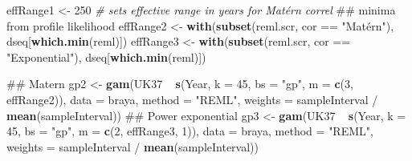 \documentclass[12pt,]{article}
\newenvironment{Shaded}{\begin{snugshade}}{\end{snugshade}}
\newcommand{\KeywordTok}[1]{\textcolor[rgb]{0.13,0.29,0.53}{\textbf{{#1}}}}
\newcommand{\DataTypeTok}[1]{\textcolor[rgb]{0.13,0.29,0.53}{{#1}}}
\newcommand{\DecValTok}[1]{\textcolor[rgb]{0.00,0.00,0.81}{{#1}}}
\newcommand{\StringTok}[1]{\textcolor[rgb]{0.31,0.60,0.02}{{#1}}}
\newcommand{\CommentTok}[1]{\textcolor[rgb]{0.56,0.35,0.01}{\textit{{#1}}}}
\newcommand{\NormalTok}[1]{{#1}}
\begin{document}
\begin{Shaded}
\begin{Highlighting}[]
\NormalTok{effRange1 <-}\StringTok{ }\DecValTok{250}      \CommentTok{# sets effective range in years for Matérn correl}
\NormalTok{## minima from profile likelihood}
\NormalTok{effRange2 <-}\StringTok{ }\KeywordTok{with}\NormalTok{(}\KeywordTok{subset}\NormalTok{(reml.scr, cor ==}\StringTok{ "Matérn"}\NormalTok{), dseq[}\KeywordTok{which.min}\NormalTok{(reml)])}
\NormalTok{effRange3 <-}\StringTok{ }\KeywordTok{with}\NormalTok{(}\KeywordTok{subset}\NormalTok{(reml.scr, cor ==}\StringTok{ "Exponential"}\NormalTok{), dseq[}\KeywordTok{which.min}\NormalTok{(reml)])}

\NormalTok{## Matern}
\NormalTok{gp2 <-}\StringTok{ }\KeywordTok{gam}\NormalTok{(UK37 ~}\StringTok{ }\KeywordTok{s}\NormalTok{(Year, }\DataTypeTok{k =} \DecValTok{45}\NormalTok{, }\DataTypeTok{bs =} \StringTok{"gp"}\NormalTok{, }\DataTypeTok{m =} \KeywordTok{c}\NormalTok{(}\DecValTok{3}\NormalTok{, effRange2)),}
           \DataTypeTok{data =} \NormalTok{braya,}
           \DataTypeTok{method =} \StringTok{"REML"}\NormalTok{, }\DataTypeTok{weights =} \NormalTok{sampleInterval /}\StringTok{ }\KeywordTok{mean}\NormalTok{(sampleInterval))}
\NormalTok{## Power exponential}
\NormalTok{gp3 <-}\StringTok{ }\KeywordTok{gam}\NormalTok{(UK37 ~}\StringTok{ }\KeywordTok{s}\NormalTok{(Year, }\DataTypeTok{k =} \DecValTok{45}\NormalTok{, }\DataTypeTok{bs =} \StringTok{"gp"}\NormalTok{, }\DataTypeTok{m =} \KeywordTok{c}\NormalTok{(}\DecValTok{2}\NormalTok{, effRange3, }\DecValTok{1}\NormalTok{)),}
           \DataTypeTok{data =} \NormalTok{braya,}
           \DataTypeTok{method =} \StringTok{"REML"}\NormalTok{, }\DataTypeTok{weights =} \NormalTok{sampleInterval /}\StringTok{ }\KeywordTok{mean}\NormalTok{(sampleInterval))}


\end{Highlighting}
\end{Shaded}
\end{document}
